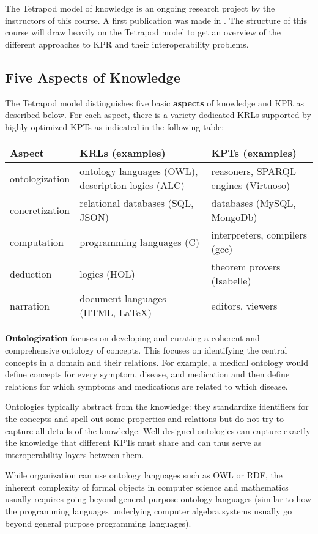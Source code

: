 The Tetrapod model of knowledge is an ongoing research project by the instructors of this course.
A first publication was made in \cite{CFKR:tetrapod:19}.
The structure of this course will draw heavily on the Tetrapod model to get an overview of the different approaches to KPR and their interoperability problems.

\subsection{Five Aspects of Knowledge}

The Tetrapod model distinguishes five basic \textbf{aspects} of knowledge and KPR as described below.
For each aspect, there is a variety dedicated KRLs supported by highly optimized KPTs as indicated in the following table:

\begin{center}
\begin{tabular}{lll}
Aspect & KRLs (examples) & KPTs (examples) \\
\hline
ontologization & ontology languages (OWL), description logics (ALC) & reasoners, SPARQL engines (Virtuoso) \\
concretization & relational databases (SQL, JSON) & databases (MySQL, MongoDb) \\
computation & programming languages (C) & interpreters, compilers (gcc) \\
deduction & logics (HOL) & theorem provers (Isabelle) \\
narration & document languages (HTML, LaTeX) & editors, viewers
\end{tabular}
\end{center}

\textbf{Ontologization} focuses on developing and curating a coherent and comprehensive ontology of concepts.
This focuses on identifying the central concepts in a domain and their relations.
For example, a medical ontology would define concepts for every symptom, disease, and medication and then define relations for which symptoms and medications are related to which disease.

Ontologies typically abstract from the knowledge: they standardize identifiers for the concepts and spell out some properties and relations but do not try to capture all details of the knowledge.
Well-designed ontologies can capture exactly the knowledge that different KPTs must share and can thus serve as interoperability layers between them.

While organization can use ontology languages such as OWL or RDF, the inherent complexity of formal objects in computer science and mathematics usually requires going beyond general purpose ontology languages (similar to how the programming languages underlying computer algebra systems usually go beyond general purpose programming languages).

